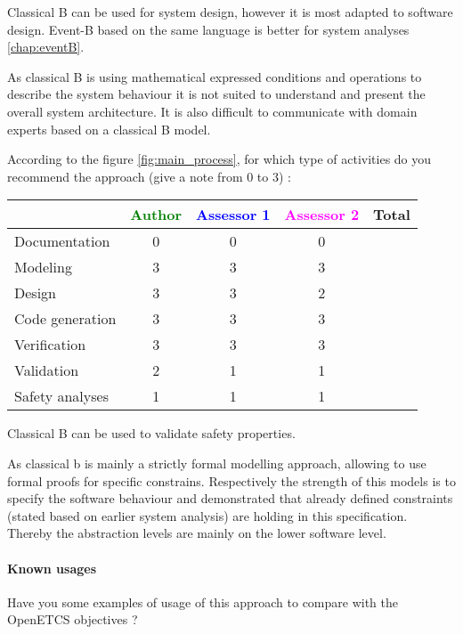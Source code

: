 \begin{author_comment}
Classical B can be used for system design, however it is most adapted to software design. Event-B  based on the same language is better for system analyses \ref{chap:eventB}.
\end{author_comment}


\begin{assessor2}
As classical B is using mathematical expressed conditions and operations to describe the system behaviour it is not suited to understand and present the overall system architecture. It is also difficult to communicate with domain experts based on a classical B model.
\end{assessor2}

According to the figure \ref{fig:main_process}, for which type of activities do you recommend the approach (give a note from 0 to  3) :

\begin{tabular}{|l | c | c | c | c|}
\hline
& \textcolor{green}{Author} & \textcolor{blue}{Assessor 1} & \textcolor{magenta}{Assessor 2} & Total \\
\hline 
Documentation & 0 & 0 & 0 &  \\
\hline
Modeling & 3 & 3 & 3  &  \\
\hline
Design & 3 & 3 & 2 & \\
\hline
Code generation & 3 & 3 & 3 & \\
\hline
Verification & 3 & 3 & 3 & \\
\hline
Validation & 2 & 1 & 1 & \\
\hline
Safety analyses & 1 & 1 & 1 & \\
\hline
\end{tabular}


\begin{author_comment}
Classical B  can be used to  validate safety properties.
\end{author_comment}

\begin{assessor2}
As classical b is mainly a strictly formal modelling approach, allowing to use formal proofs for specific constrains. Respectively the strength of this models is to specify the software behaviour and demonstrated that already defined constraints (stated based on earlier system analysis) are holding in this specification. Thereby the abstraction levels are mainly on the lower software level.
\end{assessor2}

\paragraph{Known usages} Have you some examples of usage of this approach to  compare with the OpenETCS objectives ?

